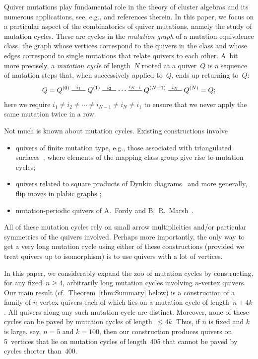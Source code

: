 \documentclass[11pt, letterpaper]{amsart}
\theoremstyle{definition}
\numberwithin{equation}{section}
\newcommand{\mutation}[1]{\stackrel{#1}{\rule[.5ex]{2em}{0.5pt}}}
\begin{document}
Quiver mutations play fundamental role in the theory of cluster algebras and its numerous applications, 
see, e.g., \cite{FWZ} and references therein. 
In this paper, we focus on a particular aspect of the combinatorics of quiver mutations, namely 
the study of mutation cycles.
These are cycles in the \emph{mutation graph} of a mutation equivalence class,
the graph whose vertices correspond to the quivers in the class
and whose edges correspond to single mutations that relate quivers to each other. 
A~bit more precisely, a \emph{mutation cycle} of length~$N$ rooted at a quiver~$Q$
is a sequence of mutation steps that, when successively applied to~$Q$, ends up returning to~$Q$: 
\begin{equation*}
Q=Q^{(0)} \mutation{i_1}
Q^{(1)} \mutation{i_2}
\cdots
\mutation{i_{N-1}} Q^{(N-1)} \mutation{i_N}
Q^{(N)}=Q; 
\end{equation*}
here we require  $i_1\neq i_2\neq \cdots\neq i_{N-1}\neq i_N\neq i_1$ to ensure that we never 
apply the same mutation twice in a row. 

Not much is known about mutation cycles. Existing constructions involve 
\begin{itemize}[leftmargin=.15in]
\item 
quivers of finite mutation type, e.g., those associated with triangulated surfaces~\cite{MR2448067},
where elements of the mapping class group give rise to mutation cycles; 
\item
quivers related to square products of Dynkin diagrams~\cite{keller-annals, MR2767952} and more generally, 
flip moves in plabic graphs \cite{balitskiy-wellman}; 
\item
mutation-periodic quivers of  A.~Fordy and B.~R.~Marsh~\cite{Fordy-Marsh}. 
\end{itemize}
All of these mutation cycles rely on small arrow multiplicities and/or particular symmetries of the quivers involved. 
Perhaps more importantly, the only way to get a very long mutation cycle using either of these constructions
(provided we treat quivers up to isomorphism) 
is to use quivers with a lot of vertices.

In this paper, we considerably expand the zoo of mutation cycles by constructing,
for any fixed~$n\ge 4$, 
arbitrarily long mutation cycles involving $n$-vertex quivers. \linebreak[3]
Our main result (cf.\ Theorem~\ref{thm:Summary} below)
is a construction of a family of $n$-vertex quivers 
each of which lies on a mutation cycle of length~${n+4k}$. 
All quivers along any such mutation cycle are distinct. 
Moreover, none of these cycles can be paved by mutation cycles of length~${\le 4k}$. 
Thus, if $n$ is fixed and $k$ is large, say, $n=5$ and $k=100$,
then our construction produces quivers on 5~vertices that lie on mutation cycles of length~405 that cannot be paved by
cycles shorter than~400. 
\end{document}

